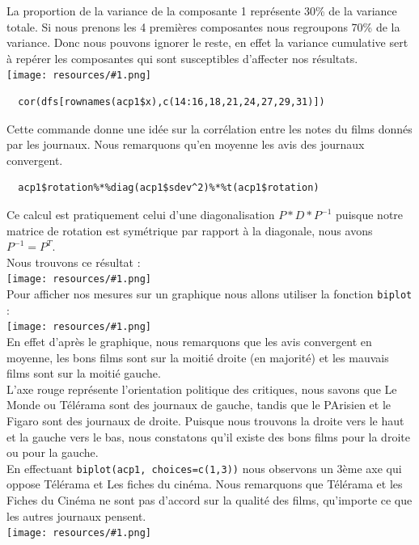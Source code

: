 \documentclass{report}
\newcommand{\photo}[1]{\\
    \texttt{[image: resources/\#1.png]}
\\
}
\begin{document}
La proportion de la variance de la composante 1 représente 30\% de la variance totale. Si nous prenons les 4
premières composantes nous regroupons 70\% de la variance. Donc nous pouvons ignorer le reste, en effet
la variance cumulative sert à repérer les composantes qui sont susceptibles d'affecter nos résultats.
\photo{10}
\begin{verbatim}
  cor(dfs[rownames(acp1$x),c(14:16,18,21,24,27,29,31)])
\end{verbatim}
Cette commande donne une idée sur la corrélation entre les notes du films donnés par les journaux. Nous
remarquons qu'en moyenne les avis des journaux convergent.
\begin{verbatim}
  acp1$rotation%*%diag(acp1$sdev^2)%*%t(acp1$rotation)
\end{verbatim}
Ce calcul est pratiquement celui d'une diagonalisation $P*D*P^{-1}$ puisque notre matrice de rotation est
symétrique par rapport à la diagonale, nous avons $P^{-1}=P^T$. \\
Nous trouvons ce résultat :
\photo{11}
Pour afficher nos mesures sur un graphique nous allons utiliser la fonction \texttt{biplot} :
\photo{12}
En effet d'après le graphique, nous remarquons que les avis convergent en moyenne, les bons films sont sur la moitié droite
(en majorité) et les mauvais films sont sur la moitié gauche.\\
L'axe rouge représente l'orientation politique des critiques, nous savons que Le Monde ou Télérama sont
des journaux de gauche, tandis que le PArisien et le Figaro sont des journaux de droite.
Puisque nous trouvons la droite vers le haut et la gauche vers le bas, nous constatons qu'il existe des bons
films pour la droite ou pour la gauche.\\
En effectuant \texttt{biplot(acp1, choices=c(1,3))} nous observons un 3ème axe qui oppose Télérama et Les fiches du cinéma.
Nous remarquons que Télérama et les Fiches du Cinéma ne sont pas d'accord sur la qualité des films, qu'importe ce que
les autres journaux pensent.
\photo{13}
\end{document}
